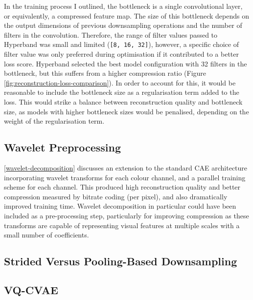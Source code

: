 \documentclass[10pt,twocolumn,letterpaper]{article}
\begin{document}
In the training process I outlined, the bottleneck is a single convolutional layer, or equivalently, a compressed feature map. The size of this bottleneck depends on the output dimensions of previous downsampling operations and the number of filters in the convolution. Therefore, the range of filter values passed to Hyperband was small and limited (\texttt{[8, 16, 32]}), however, a specific choice of filter value was only preferred during optimisation if it contributed to a better loss score. Hyperband selected the best model configuration with 32 filters in the bottleneck, but this suffers from a higher compression ratio (Figure \ref{fig:reconstruction-loss-comparison}). In order to account for this, it would be reasonable to include the bottleneck size as a regularisation term added to the loss. This would strike a balance between reconstruction quality and bottleneck size, as models with higher bottleneck sizes would be penalised, depending on the weight of the regularisation term.

\subsection{Wavelet Preprocessing}

\ref{wavelet-decomposition} discusses an extension to the standard CAE architecture incorporating wavelet transforms for each colour channel, and a parallel training scheme for each channel. This produced high reconstruction quality and better compression measured by bitrate coding (per pixel), and also dramatically improved training time. Wavelet decomposition in particular could have been included as a pre-processing step, particularly for improving compression as these transforms are capable of representing visual features at multiple scales with a small number of coefficients.

\subsection{Strided Versus Pooling-Based Downsampling}

 
\subsection{VQ-CVAE}
\end{document}
